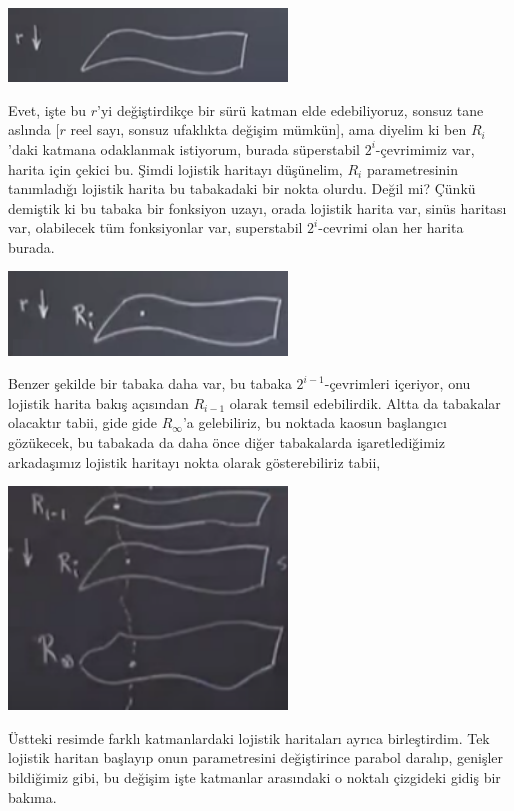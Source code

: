 \documentclass[12pt,fleqn]{article}\usepackage{../../common}
\begin{document}
\includegraphics[width=20em]{22_01.png}

Evet, işte bu $r$'yi değiştirdikçe bir sürü katman elde edebiliyoruz,
sonsuz tane aslında [$r$ reel sayı, sonsuz ufaklıkta değişim mümkün], ama
diyelim ki ben $R_i$'daki katmana odaklanmak istiyorum, burada süperstabil
$2^i$-çevrimimiz var, harita için çekici bu. Şimdi lojistik haritayı
düşünelim, $R_i$ parametresinin tanımladığı lojistik harita bu tabakadaki
bir nokta olurdu. Değil mi? Çünkü demiştik ki bu tabaka bir fonksiyon
uzayı, orada lojistik harita var, sinüs haritası var, olabilecek tüm
fonksiyonlar var, superstabil $2^i$-cevrimi olan her harita burada.

\includegraphics[width=20em]{22_02.png}

Benzer şekilde bir tabaka daha var, bu tabaka $2^{i-1}$-çevrimleri
içeriyor, onu lojistik harita bakış açısından $R_{i-1}$ olarak temsil
edebilirdik. Altta da tabakalar olacaktır tabii, gide gide $R_\infty$'a
gelebiliriz, bu noktada kaosun başlangıcı gözükecek, bu tabakada da daha
önce diğer tabakalarda işaretlediğimiz arkadaşımız lojistik haritayı nokta
olarak gösterebiliriz tabii,

\includegraphics[width=20em]{22_03.png}

Üstteki resimde farklı katmanlardaki lojistik haritaları ayrıca
birleştirdim. Tek lojistik haritan başlayıp onun parametresini değiştirince
parabol daralıp, genişler bildiğimiz gibi, bu değişim işte katmanlar
arasındaki o noktalı çizgideki gidiş bir bakıma.
\end{document}
